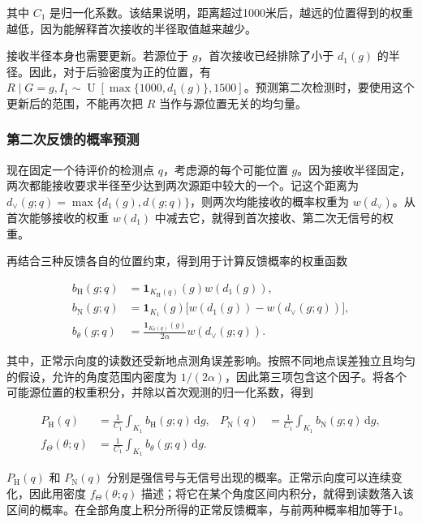 \documentclass[UTF8,a4paper,zihao=-4,fontset=none]{ctexart}
\begin{document}
其中 \(C_1\) 是归一化系数。该结果说明，距离超过1000米后，越远的位置得到的权重越低，因为能解释首次接收的半径取值越来越少。

接收半径本身也需要更新。若源位于 \(g\)，首次接收已经排除了小于 \(d_1(g)\) 的半径。因此，对于后验密度为正的位置，有 \(R\mid G=g,I_1\sim\operatorname{U}[\max\{1000,d_1(g)\},1500]\)。预测第二次检测时，要使用这个更新后的范围，不能再次把 \(R\) 当作与源位置无关的均匀量。

\subsubsection{第二次反馈的概率预测}

现在固定一个待评价的检测点 \(q\)，考虑源的每个可能位置 \(g\)。因为接收半径固定，两次都能接收要求半径至少达到两次源距中较大的一个。记这个距离为 \(d_\vee(g;q)=\max\{d_1(g),d(g;q)\}\)，则两次均能接收的概率权重为 \(w(d_\vee)\)。从首次能够接收的权重 \(w(d_1)\) 中减去它，就得到首次接收、第二次无信号的权重。

再结合三种反馈各自的位置约束，得到用于计算反馈概率的权重函数

\begin{equation}
\begin{aligned}
 b_{\mathrm H}(g;q)&=\mathbf1_{K_{\mathrm H}(q)}(g)w(d_1(g)),\\
 b_{\mathrm N}(g;q)&=\mathbf1_{K_1}(g)\bigl[w(d_1(g))-w(d_\vee(g;q))\bigr],\\
 b_\theta(g;q)&=\frac{\mathbf1_{K_\theta(q)}(g)}{2\alpha}w(d_\vee(g;q)).
\end{aligned}
\label{eq:q2-pair-feedback-weights}
\end{equation}

其中，正常示向度的读数还受新地点测角误差影响。按照不同地点误差独立且均匀的假设，允许的角度范围内密度为 \(1/(2\alpha)\)，因此第三项包含这个因子。将各个可能源位置的权重积分，并除以首次观测的归一化系数，得到

\begin{equation}
\begin{aligned}
 P_{\mathrm H}(q)&=\frac{1}{C_1}\int_{K_1}b_{\mathrm H}(g;q)\,\mathrm dg,
 &P_{\mathrm N}(q)&=\frac{1}{C_1}\int_{K_1}b_{\mathrm N}(g;q)\,\mathrm dg,\\
 f_\Theta(\theta;q)&=\frac{1}{C_1}\int_{K_1}b_\theta(g;q)\,\mathrm dg.
\end{aligned}
\label{eq:q2-pair-prediction}
\end{equation}

\(P_{\mathrm H}(q)\) 和 \(P_{\mathrm N}(q)\) 分别是强信号与无信号出现的概率。正常示向度可以连续变化，因此用密度 \(f_\Theta(\theta;q)\) 描述；将它在某个角度区间内积分，就得到读数落入该区间的概率。在全部角度上积分所得的正常反馈概率，与前两种概率相加等于1。
\end{document}
